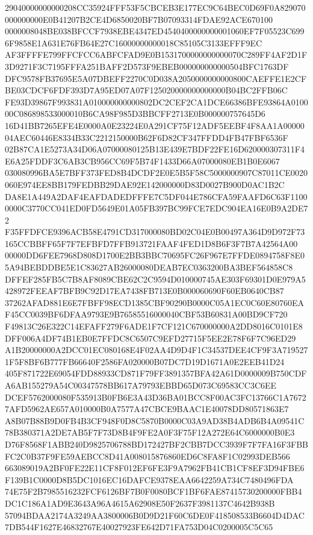 \documentclass[UTF8,fontset=fandol,zihao=-4,a4paper]{ctexart}
\begin{document}
{{29040000000000208CC35924FFF53F5CBCEB3E177EC9C64BEC0D69F0A829070000000000E0B41207B2CE4D6850020BF7B07093314FDAE92ACE670100
0000008048BE038BFCCF7938EBE4347ED4540400000000001060EF7F05523C6996F9858E1A631E76FB64E27C16000000000018C85105C3133EFFF9EC
AF3FFFFE799FFCFCC6ABFCFAD9E0B1531700000000000070C289FF4AF2D1F3D9271F3C7195FFFA251BAFF2D573F9EBEB000000000000504BFC1763DF
DFC9578FB37695E5A07DBEFF2270C0D038A2050000000000800CAEFFE1E2CFBE03CDCF6FDF393D7A95ED07A07F125020000000000000B04BC2FFB06C
FE93D39867F993831A010000000000802DC2CEF2CA1DCE66386BFE93864A010000C086898533000010B6CA98F985D3BBCFF2713E0B000000757645D6
16D41BB7265EFE4E0000A0E23224E0A291CF75F12ADF5EEBF4F8AA1A0000004AEC60446E8334B33C2212150000B62F6D82CF347FFDD4FB47FBF6536F
02B87CA1E5273A34D06A07000080125B13E439E7BDF22FE16D620000307311F4E6A25FDDF3C6AB3CB956CC69F5B74F1433D66A07000080EB1B0E6067
030080996BA5E7BFF373FED8B4DCDF2E0E5B5F58C5000000907C87011CE0020060E974EE8BB179FEDBB29DAE92E142000000D83D0027B900D0AC1B2C
DA8E1A449A2DAF4EAFDADEDFFFE7C5DF044E786CFA59FAAFD6C63F11000000C3770CC041ED0FD5649E01A05FB397BC99FCE7EDC904EA16E0B9A2DE72
F35FFDFCE9396ACB58E4791CD317000080BD02C04E0B00497A364D9D972F73165CCBBFF65F7F7EFBFD7FFB913721FAAF4FED1D8B6F3F7B7A42564A00
00000DD6FEE7968D808D1700E2BB3BBC70695FC26F967E7FFDE0894758F8E05A94BEBDDBE5E1C83627AB26000080DEAB7EC0363200BA3BEF564858C8
DFFEF285FB5C7B8AF8089CBE62C2C9594D010000745AE303F69301D0E979A5428972FEEAF7BFB9C92D17EA7438FB713E0B000060690F60EB0640CB87
37262AFAD881E6E7FBFF98ECD1385CBF90290B0000C05A1EC0C60E80760EAF45CC0039BF6DFAA9793E9B76585516000040CBF53B60831A00BD9CF720
F49813C26E322C14EFAFF279F6ADE1F7CF121C670000000A2DD8016C0101E8DFF006A4DF74B1EB0E7FFDC8C6507C9EFD27715F5EE2E78F6F7C96ED29
A1B20000000A2DCC01EC080168E4F02AA4D9D4F1C34537DEE4CF9F3A7195271F5F8BF6B777FB66640F2586FA020000B07DC7D19D1671A0E2EEB41D24
405F871722E69054FDD88933CD871F79FF3891357BFA42A61D0000009B750CDFA6AB155279A54C00347578BB617A79793EBBD65D073C69583CC3C6EE
DCEF5762000080F535913B0FB6E3A43D36BA01BCC8F00AC3FC13766C1A76727AFD5962AE657A010000B0A7577A47CBCE9BAAC1E40078DD80571863E7
A8B07B88B9D0FB4B3CF948F0D8C5870B0000C03A9AD38B4ADB6B4A09541C78B380371A2DE7AB5F7F73D8B4F9FE2A0F3F75F12A272E64C6000000B0E3
D76F8568F1ABB240D9825706788BD172427BF2CBB7DCC3939F7F7FA16F3FBBFC2C0B37F9FE59AEBCC8D41A008015876860ED6C8FA8F1C02993DEB566
663089019A2BF0FE22E11CF8F012EF6FE3F9A7962FB41CB1CF8EF3D94FBE6F139B1C0000D8B5DC1016EC16DAFCE9378EAA6642259A734C7480496FDA
74E75F2B7985516232FCF6126BF7B0F0080BCF1BF6FAE87415730200000FBB4DC1C186A1AD9E3643A96A4615A62908E50F2637F3981137C4642B938B
57094BDAA2174A3249AA3800006B0D9D21F60C6DE0F418508533B6604D4DAC7DB544F1627E46832767E40027923FE642D71FA753D04C0200005C5C65
}}
\end{document}
